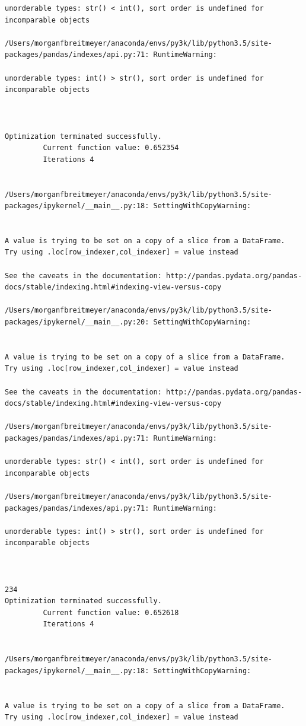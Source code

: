 \begin{lstlisting}
unorderable types: str() < int(), sort order is undefined for incomparable objects

/Users/morganfbreitmeyer/anaconda/envs/py3k/lib/python3.5/site-packages/pandas/indexes/api.py:71: RuntimeWarning:

unorderable types: int() > str(), sort order is undefined for incomparable objects



Optimization terminated successfully.
         Current function value: 0.652354
         Iterations 4


/Users/morganfbreitmeyer/anaconda/envs/py3k/lib/python3.5/site-packages/ipykernel/__main__.py:18: SettingWithCopyWarning:


A value is trying to be set on a copy of a slice from a DataFrame.
Try using .loc[row_indexer,col_indexer] = value instead

See the caveats in the documentation: http://pandas.pydata.org/pandas-docs/stable/indexing.html#indexing-view-versus-copy

/Users/morganfbreitmeyer/anaconda/envs/py3k/lib/python3.5/site-packages/ipykernel/__main__.py:20: SettingWithCopyWarning:


A value is trying to be set on a copy of a slice from a DataFrame.
Try using .loc[row_indexer,col_indexer] = value instead

See the caveats in the documentation: http://pandas.pydata.org/pandas-docs/stable/indexing.html#indexing-view-versus-copy

/Users/morganfbreitmeyer/anaconda/envs/py3k/lib/python3.5/site-packages/pandas/indexes/api.py:71: RuntimeWarning:

unorderable types: str() < int(), sort order is undefined for incomparable objects

/Users/morganfbreitmeyer/anaconda/envs/py3k/lib/python3.5/site-packages/pandas/indexes/api.py:71: RuntimeWarning:

unorderable types: int() > str(), sort order is undefined for incomparable objects



234
Optimization terminated successfully.
         Current function value: 0.652618
         Iterations 4


/Users/morganfbreitmeyer/anaconda/envs/py3k/lib/python3.5/site-packages/ipykernel/__main__.py:18: SettingWithCopyWarning:


A value is trying to be set on a copy of a slice from a DataFrame.
Try using .loc[row_indexer,col_indexer] = value instead


\end{lstlisting}
